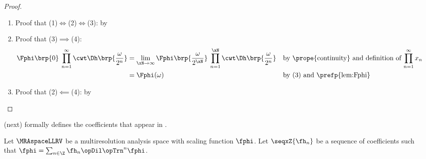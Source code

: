 \begin{proof}
  \begin{enumerate}
    \item Proof that (1)$\iff$(2)$\iff$(3): by 
    \item Proof that (3)$\implies$(4):
      \begin{align*}
        \Fphi\brp{0}\:\prod_{n=1}^{\infty} \cwt \Dh\brp{\frac{\omega}{2^n}}
          &= \lim_{\xN\to\infty}\Fphi\brp{\frac{\omega}{2^{\xN}}}\:\prod_{n=1}^{\xN} \cwt \Dh\brp{\frac{\omega}{2^n}}
          && \text{by \prope{continuity} and definition of $\prod_{n=1}^\infty x_n$}
        \\&= \Fphi(\omega)
          && \text{by (3) and \prefp{lem:Fphi}}
      \end{align*}
    \item Proof that (2)$\impliedby$(4): by 
  \end{enumerate}
\end{proof}





 (next) formally defines the coefficients that appear in .
\begin{definition}%
\label{def:hn}
\label{def:mrasys}
Let $\MRAspaceLLRV$ be a multiresolution analysis space with scaling function $\fphi$.
Let $\seqxZ{\fh_n}$ be a sequence of coefficients such that $\fphi = \sum_{n\in\Z} \fh_n \opDil\opTrn^n \fphi$.
\end{definition}

